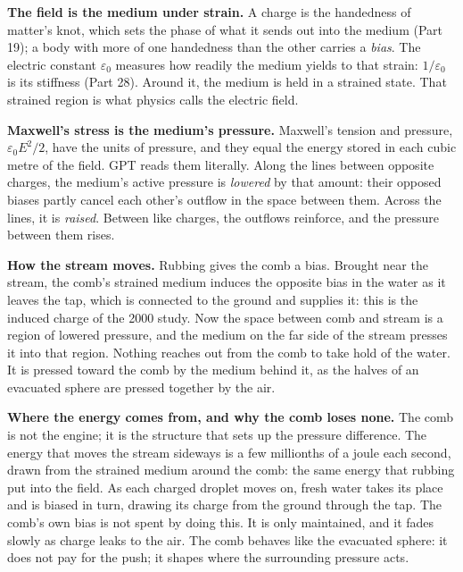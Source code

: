 \begin{hypbar}
\textbf{The field is the medium under strain.} A charge is the handedness of matter's knot, which sets the phase of what it sends out into the medium (Part 19); a body with more of one handedness than the other carries a \emph{bias}. The electric constant $\varepsilon_0$ measures how readily the medium yields to that strain: $1/\varepsilon_0$ is its stiffness (Part 28).\footnotemark{} Around it, the medium is held in a strained state. That strained region is what physics calls the electric field.

\textbf{Maxwell's stress is the medium's pressure.} Maxwell's tension and pressure, $\varepsilon_0E^2/2$, have the units of pressure, and they equal the energy stored in each cubic metre of the field. GPT reads them literally. Along the lines between opposite charges, the medium's active pressure is \emph{lowered} by that amount: their opposed biases partly cancel each other's outflow in the space between them. Across the lines, it is \emph{raised}. Between like charges, the outflows reinforce, and the pressure between them rises.

\textbf{How the stream moves.} Rubbing gives the comb a bias. Brought near the stream, the comb's strained medium induces the opposite bias in the water as it leaves the tap, which is connected to the ground and supplies it: this is the induced charge of the 2000 study. Now the space between comb and stream is a region of lowered pressure, and the medium on the far side of the stream presses it into that region. Nothing reaches out from the comb to take hold of the water. It is pressed toward the comb by the medium behind it, as the halves of an evacuated sphere are pressed together by the air.

\textbf{Where the energy comes from, and why the comb loses none.} The comb is not the engine; it is the structure that sets up the pressure difference. The energy that moves the stream sideways is a few millionths of a joule each second, drawn from the strained medium around the comb: the same energy that rubbing put into the field. As each charged droplet moves on, fresh water takes its place and is biased in turn, drawing its charge from the ground through the tap. The comb's own bias is not spent by doing this. It is only maintained, and it fades slowly as charge leaks to the air. The comb behaves like the evacuated sphere: it does not pay for the push; it shapes where the surrounding pressure acts.
\end{hypbar}

